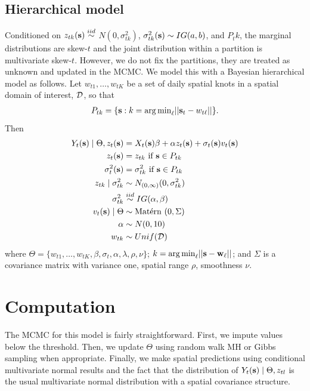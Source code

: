 \documentclass[11pt]{article}
\begin{document}
\subsection{Hierarchical model}\label{s:hier}
Conditioned on $z_{tk}(\mbox{\bf s}) \stackrel{iid}{\sim} $ $N(0, \sigma^2_{tk})$, $\sigma^2_{tk}(\mbox{\bf s}) \sim IG(a, b)$, and $P_tk$, the marginal distributions are skew-$t$ and the joint distribution within a partition is multivariate skew-$t$.
However, we do not fix the partitions, they are treated as unknown and updated in the MCMC.
We model this with a Bayesian hierarchical model as follows.
Let $w_{t1}, \ldots, w_{tK}$ be a set of daily spatial knots in a spatial domain of interest, ${\cal D}$, so that
\begin{align*}
 P_{tk} = \{\mbox{\bf s} : k = {\mathop{\rm arg\, min}}_\ell || \mbox{\bf s}_t - w_{t\ell} ||\}.
\end{align*}
Then
\begin{align}
   Y_t(\mbox{\bf s}) \mid \Theta, z_{t}(\mbox{\bf s}) &= X_t(\mbox{\bf s}) \beta + \alpha z_t(\mbox{\bf s}) + \sigma
   _t(\mbox{\bf s}) v_t(\mbox{\bf s}) \label{eq:hier}\\
   z_t(\mbox{\bf s}) &= z_{tk} \text{ if } \mbox{\bf s} \in P_{tk}\\
   \sigma^2_{t}(\mbox{\bf s}) &= \sigma^2_{tk} \text{ if } \mbox{\bf s} \in P_{tk}\\
   z_{tk} \mid \sigma^2_{tk} &\sim N_{(0, \infty)}(0, \sigma^2_{tk})\\
   \sigma^2_{tk} &\stackrel{iid}{\sim} IG(\alpha, \beta)\\
   v_t(\mbox{\bf s}) \mid \Theta &\sim \mbox{Mat$\acute{\mbox{e}}$rn }(0, \Sigma)\\
   \alpha &\sim N(0, 10)\\
   w_{tk} &\sim Unif({\cal D})
\end{align}
where $\Theta = \{w_{t1}, \ldots, w_{tK}, \beta, \sigma_t, \alpha, \lambda, \rho, \nu \}$; \mbox{$k = {\mathop{\rm arg\, min}}_\ell ||\mbox{\bf s} - \mbox{\bf w}_\ell ||$}; and $\Sigma$ is a \Matern covariance matrix with variance one, spatial range $\rho$, smoothness $\nu$.

\section{Computation}\label{s:comp}
The MCMC for this model is fairly straightforward.
First, we impute values below the threshold.
Then, we update $\Theta$ using random walk MH or Gibbs sampling when appropriate.
Finally, we make spatial predictions using conditional multivariate normal results and the fact that the distribution of $Y_t(\mbox{\bf s}) \mid \Theta, z_{tl}$ is the usual multivariate normal distribution with a \Matern spatial covariance structure.
\end{document}
